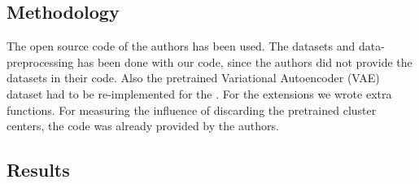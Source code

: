 
\subsection*{Methodology}



The open source code of the authors has been used. The datasets and data-preprocessing has been done with our code, since the authors did not provide the datasets in their code. Also the pretrained Variational Autoencoder (VAE) dataset had to be re-implemented for the \revMNIST. For the extensions we wrote extra functions. For measuring the influence of discarding the pretrained cluster centers, the code was already provided by the authors.




\subsection*{Results}



